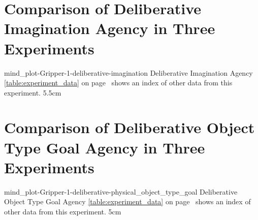 {\clearpage
  \section{Comparison of Deliberative Imagination Agency in Three Experiments}
  \experimentcausegroupplots{\dataappendixmaxtime}
                            {\dataappendixexperimentonemaxtime}
                            {\dataappendixexperimenttwomaxtime}
                            {\dataappendixexperimentthreemaxtime}
                            {\dataappendixexperimentonename}
                            {\dataappendixexperimenttwoname}
                            {\dataappendixexperimentthreename}
                            {\dataappendixexperimentoneprettyname}
                            {\dataappendixexperimenttwoprettyname}
                            \experimentcausegroupplotscontinued{\dataappendixexperimentthreeprettyname}
                                                               {mind_plot-Gripper-1-deliberative-imagination}
                                                               {Deliberative Imagination Agency}
                                                               {  {\mbox{\autoref{table:experiment_data}}} on
                                                                 {\mbox{page~\pageref{table:experiment_data}}} shows an index of other data
                                                                 from this experiment.}
                                                               {5.5cm}
}
{\clearpage
  \section{Comparison of Deliberative Object Type Goal Agency in Three Experiments}
  \experimentcausegroupplots{\dataappendixmaxtime}
                            {\dataappendixexperimentonemaxtime}
                            {\dataappendixexperimenttwomaxtime}
                            {\dataappendixexperimentthreemaxtime}
                            {\dataappendixexperimentonename}
                            {\dataappendixexperimenttwoname}
                            {\dataappendixexperimentthreename}
                            {\dataappendixexperimentoneprettyname}
                            {\dataappendixexperimenttwoprettyname}
                            \experimentcausegroupplotscontinued{\dataappendixexperimentthreeprettyname}
                                                               {mind_plot-Gripper-1-deliberative-physical_object_type_goal}
                                                               {Deliberative Object Type Goal Agency}
                                                               {  {\mbox{\autoref{table:experiment_data}}} on
                                                                 {\mbox{page~\pageref{table:experiment_data}}} shows an index of other data
                                                                 from this experiment.}
                                                               {5cm}
}
